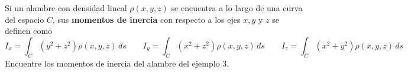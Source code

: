 \item Si un alambre con densidad lineal $\rho(x, y, z)$ se encuentra a lo largo de una curva del espacio $C$, sus \textbf{momentos de inercia} con respecto a los ejes $x, y$ y $z$ se definen como
    \[ I_x = \int_C (y^2 + z^2) \rho(x, y, z) \, ds \qquad I_y = \int_C (x^2 + z^2) \rho(x, y, z) \, ds \qquad I_z = \int_C (x^2 + y^2) \rho(x, y, z) \, ds \]
    Encuentre los momentos de inercia del alambre del ejemplo 3.
